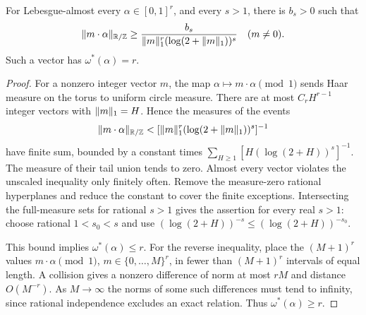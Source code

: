 \begin{lemma}\label{lem:metric-separation}
For Lebesgue-almost every $\alpha\in[0,1]^r$, and every $s>1$, there is $b_s>0$ such that
\begin{equation}\label{eq:log-separation}
 \lVert m\cdot\alpha\rVert_{\mathbb R/\mathbb Z}\ge
       \frac{b_s}{\lVert m\rVert_1^r(\log(2+\lVert m\rVert_1))^s}
                     \quad(m\ne0).
\end{equation}
Such a vector has $\omega^*(\alpha)=r$.
\end{lemma}
\begin{proof}
For a nonzero integer vector $m$, the map $\alpha\mapsto m\cdot\alpha\pmod1$ sends Haar measure on the torus to uniform circle measure. There are at most $C_rH^{r-1}$ integer vectors with $\lVert m\rVert_1=H$. Hence the measures of the events
\[
 \lVert m\cdot\alpha\rVert_{\mathbb R/\mathbb Z}<[\lVert m\rVert_1^r(\log(2+\lVert m\rVert_1))^s]^{-1}
\]
have finite sum, bounded by a constant times
$\sum_{H\ge1}[H(\log(2+H))^s]^{-1}$.
The measure of their tail union tends to zero. Almost every vector violates the unscaled inequality only finitely often. Remove the measure-zero rational hyperplanes and reduce the constant to cover the finite exceptions. Intersecting the full-measure sets for rational $s>1$ gives the assertion for every real $s>1$: choose rational $1<s_0<s$ and use $(\log(2+H))^{-s}\le(\log(2+H))^{-s_0}$.

This bound implies $\omega^*(\alpha)\le r$. For the reverse inequality, place the $(M+1)^r$ values $m\cdot\alpha\pmod1$, $m\in\{0,\ldots,M\}^r$, in fewer than $(M+1)^r$ intervals of equal length. A collision gives a nonzero difference of norm at most $rM$ and distance $O(M^{-r})$. As $M\to\infty$ the norms of some such differences must tend to infinity, since rational independence excludes an exact relation. Thus $\omega^*(\alpha)\ge r$.
\end{proof}

